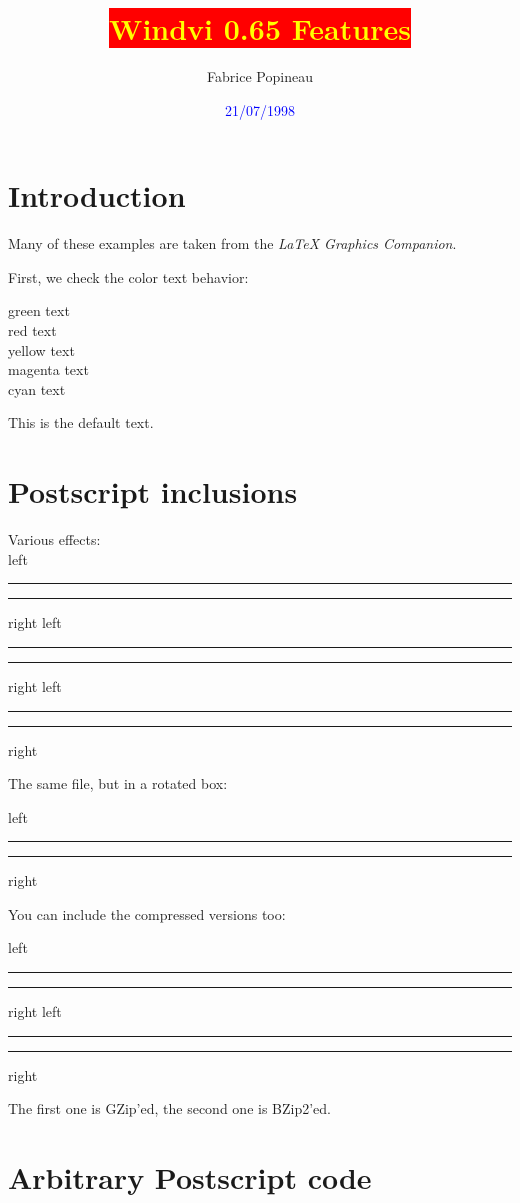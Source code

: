 \documentclass[a4paper, 11pt]{article}
\author{Fabrice Popineau}
\title{\colorbox{red}{\textcolor{yellow}{Windvi 0.65 Features}}}
\date{\textcolor{blue}{21/07/1998}}
\newcommand{\HR}{\rule{1em}{0.4pt}}
\begin{document}
\maketitle
\tableofcontents
\newpage
\section{Introduction}
\noindent
Many of these examples are taken from the \emph{LaTeX Graphics Companion}.

\noindent First, we check the color text behavior:

\begin{flushleft}
{\color{green} green text}\\
{\color{red} red text}\\
{\color{yellow} yellow text}\\
{\color{magenta} magenta text}\\
{\color{cyan} cyan text}
\end{flushleft}
%

This is the default text.
\newpage
\section{Postscript inclusions}
Various effects:
\vspace*{2cm}\mbox{}\\
\setlength\fboxsep{0pt}
left\HR
{}%
\HR right
\hfill
left \HR
{}%
\HR right \hfill
left \HR
{}%
\HR right
\vspace*{1cm}

\noindent
The same file, but in a rotated box:
\vspace*{1cm}

left\HR
{}%
\HR right
\vspace*{1cm}

\noindent You can include the compressed versions too:
\vspace*{1cm}

left\HR
{}%
\HR right
\hfill
left\HR
{}%
\HR right
\vspace*{1cm}

The first one is GZip'ed, the second one is BZip2'ed.

\newpage
\section{Arbitrary Postscript code}
\end{document}
